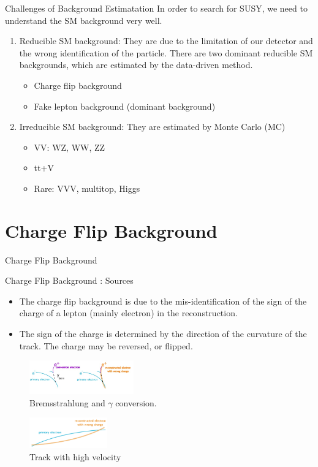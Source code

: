 \documentclass[mathserif,serif]{beamer}
\begin{document}
\begin{frame}{Challenges of Background Estimatation}
In order to search for SUSY, we need to understand the SM background very well.
\begin{enumerate}
\item Reducible SM background: They are due to the limitation of our detector and the wrong identification of the particle. There are two dominant reducible SM backgrounds, which are estimated by the data-driven method.
\begin{itemize}
\item Charge flip background
\item Fake lepton background (dominant background)
\end{itemize}
\item Irreducible SM background: They are estimated by Monte Carlo (MC)
\begin{itemize}
\item VV: WZ, WW, ZZ
\item tt+V
\item Rare: VVV, multitop, Higgs
\end{itemize}
\end{enumerate}
\end{frame}

\section{Charge Flip Background}
\begin{frame}
\begin{center}
\huge
Charge Flip Background
\end{center}
\end{frame}

\begin{frame}{Charge Flip Background : Sources}
\begin{itemize}
\item The charge flip background is due to the mis-identification of the sign of the charge of a lepton (mainly electron) in the reconstruction.
\item The sign of the charge is determined by the direction of the curvature of the track. The charge may be reversed, or flipped.
\end{itemize}
\begin{figure}
\centering
\includegraphics[width=0.4\textwidth]{data/photo/charge_flip/Brem.jpg}
\caption{Bremsstrahlung and $\gamma$ conversion.}
\end{figure}
\begin{figure}
\centering
\includegraphics[width=0.3\textwidth]{data/photo/charge_flip/WrongTrack.png}
\caption{Track with high velocity}
\end{figure}
\end{frame}
\end{document}
